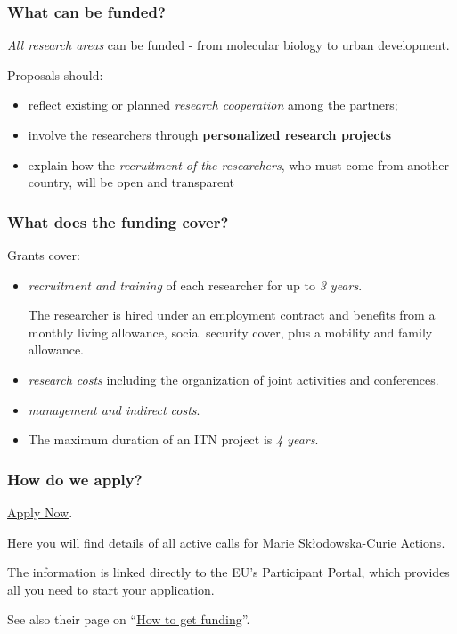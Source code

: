 \documentclass[oneside]{book}
\numberwithin{equation}{section}
\begin{document}
\subsubsection{What can be funded?}
\textit{All research areas} can be funded - from molecular biology to urban development.

%
Proposals should:
\begin{itemize}
    \item reflect existing or planned \textit{research cooperation} among the partners;
    \item involve the researchers through \textbf{personalized research projects}
    \item explain how the \textit{recruitment of the researchers}, who must come from another country, will be open and transparent
\end{itemize}

\subsubsection{What does the funding cover?}
Grants cover:
\begin{itemize}
    \item \textit{recruitment and training} of each researcher for up to \textit{3 years}.
    
    The researcher is hired under an employment contract and benefits from a monthly living allowance, social security cover, plus a mobility and family allowance.
    \item \textit{research costs} including the organization of joint activities and conferences.
    \item \textit{management and indirect costs}.
    \item The maximum duration of an ITN project is \textit{4 years}.
\end{itemize}

\subsubsection{How do we apply?}
\href{https://ec.europa.eu/research/mariecurieactions/actions/get-funding_en}{Apply Now}.

Here you will find details of all active calls for Marie Skłodowska-Curie Actions.

The information is linked directly to the EU's Participant Portal, which provides all you need to start your application.

See also their page on ``\href{https://ec.europa.eu/research/mariecurieactions/how-to/apply_en}{How to get funding}''.
\end{document}
